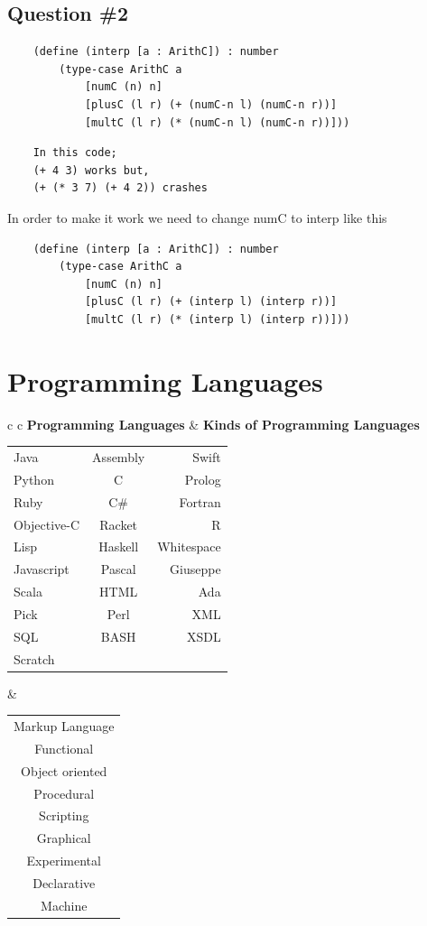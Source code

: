 \documentclass{article}
\begin{document}
\subsection*{Question \#2}

  \begin{verbatim}
    (define (interp [a : ArithC]) : number
        (type-case ArithC a
            [numC (n) n]
            [plusC (l r) (+ (numC-n l) (numC-n r))]
            [multC (l r) (* (numC-n l) (numC-n r))]))
  \end{verbatim}
  
  \begin{verbatim}
    In this code;
    (+ 4 3) works but,
    (+ (* 3 7) (+ 4 2)) crashes
  \end{verbatim}
  
  In order to make it work we need to change numC to interp like this

  \begin{verbatim}
    (define (interp [a : ArithC]) : number
        (type-case ArithC a
            [numC (n) n]
            [plusC (l r) (+ (interp l) (interp r))]
            [multC (l r) (* (interp l) (interp r))]))
  \end{verbatim}
  
  
\section*{Programming Languages}
\begin{tabular}{c c}
 \textbf{Programming Languages} & \textbf{Kinds of Programming Languages}\\
 \begin{tabular}{ l c r }
    Java & Assembly & Swift \\
    Python & C & Prolog \\
    Ruby & C\# & Fortran \\
    Objective-C & Racket & R \\
    Lisp & Haskell & Whitespace \\
    Javascript & Pascal & Giuseppe \\
    Scala & HTML & Ada \\
    Pick & Perl & XML \\
    SQL & BASH & XSDL \\
    Scratch &  &  \\
  \end{tabular}
  &
  \begin{tabular}{ c }
    Markup Language \\
    Functional \\
    Object oriented \\
    Procedural \\
    Scripting \\
    Graphical \\
    Experimental \\
    Declarative \\
    Machine \\
  \end{tabular}
\end{tabular}
\end{document}
